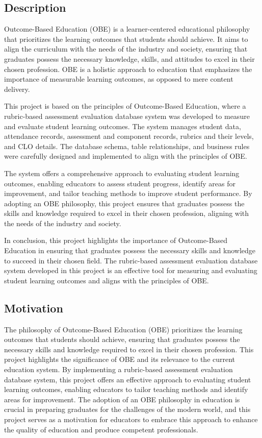 \documentclass[12pt,a4paper]{article}
\begin{document}
\subsection{Description}
Outcome-Based Education (OBE) is a learner-centered educational philosophy that prioritizes the learning outcomes that students should achieve. It aims to align the curriculum with the needs of the industry and society, ensuring that graduates possess the necessary knowledge, skills, and attitudes to excel in their chosen profession. OBE is a holistic approach to education that emphasizes the importance of measurable learning outcomes, as opposed to mere content delivery.

This project is based on the principles of Outcome-Based Education, where a rubric-based assessment evaluation database system was developed to measure and evaluate student learning outcomes. The system manages student data, attendance records, assessment and component records, rubrics and their levels, and CLO details. The database schema, table relationships, and business rules were carefully designed and implemented to align with the principles of OBE.

The system offers a comprehensive approach to evaluating student learning outcomes, enabling educators to assess student progress, identify areas for improvement, and tailor teaching methods to improve student performance. By adopting an OBE philosophy, this project ensures that graduates possess the skills and knowledge required to excel in their chosen profession, aligning with the needs of the industry and society.

In conclusion, this project highlights the importance of Outcome-Based Education in ensuring that graduates possess the necessary skills and knowledge to succeed in their chosen field. The rubric-based assessment evaluation database system developed in this project is an effective tool for measuring and evaluating student learning outcomes and aligns with the principles of OBE.
\subsection{Motivation}
The philosophy of Outcome-Based Education (OBE) prioritizes the learning outcomes that students should achieve, ensuring that graduates possess the necessary skills and knowledge required to excel in their chosen profession. This project highlights the significance of OBE and its relevance to the current education system. By implementing a rubric-based assessment evaluation database system, this project offers an effective approach to evaluating student learning outcomes, enabling educators to tailor teaching methods and identify areas for improvement. The adoption of an OBE philosophy in education is crucial in preparing graduates for the challenges of the modern world, and this project serves as a motivation for educators to embrace this approach to enhance the quality of education and produce competent professionals.
\end{document}
